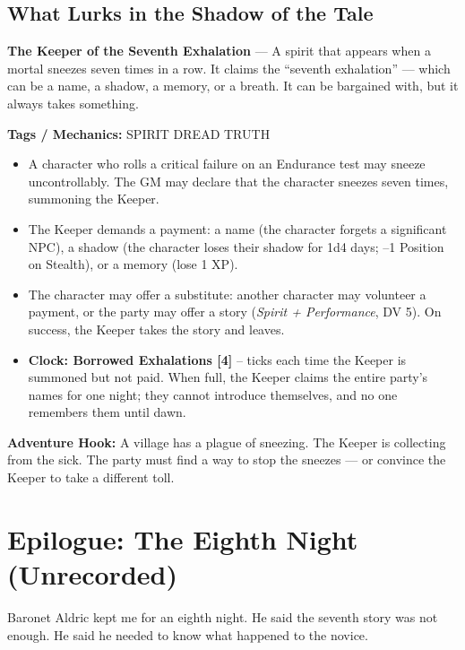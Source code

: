 \documentclass[10pt,twoside]{book}
\newcommand{\tag}[1]{\textsc{#1}}
\begin{document}
\section*{What Lurks in the Shadow of the Tale}
\begin{infobox}
\textbf{The Keeper of the Seventh Exhalation} --- A spirit that appears when a mortal sneezes seven times in a row. It claims the ``seventh exhalation'' --- which can be a name, a shadow, a memory, or a breath. It can be bargained with, but it always takes something.

\textbf{Tags / Mechanics:} \tag{SPIRIT} \tag{DREAD} \tag{TRUTH}

\begin{itemize}
\item A character who rolls a critical failure on an Endurance test may sneeze uncontrollably. The GM may declare that the character sneezes seven times, summoning the Keeper.
\item The Keeper demands a payment: a name (the character forgets a significant NPC), a shadow (the character loses their shadow for 1d4 days; --1 Position on Stealth), or a memory (lose 1 XP).
\item The character may offer a substitute: another character may volunteer a payment, or the party may offer a story (\textit{Spirit + Performance}, DV 5). On success, the Keeper takes the story and leaves.
\item \textbf{Clock: Borrowed Exhalations [4]} -- ticks each time the Keeper is summoned but not paid. When full, the Keeper claims the entire party's names for one night; they cannot introduce themselves, and no one remembers them until dawn.
\end{itemize}

\textbf{Adventure Hook:} A village has a plague of sneezing. The Keeper is collecting from the sick. The party must find a way to stop the sneezes --- or convince the Keeper to take a different toll.
\end{infobox}

\chapter*{Epilogue: The Eighth Night (Unrecorded)}

Baronet Aldric kept me for an eighth night. He said the seventh story was not enough. He said he needed to know what happened to the novice.
\end{document}
